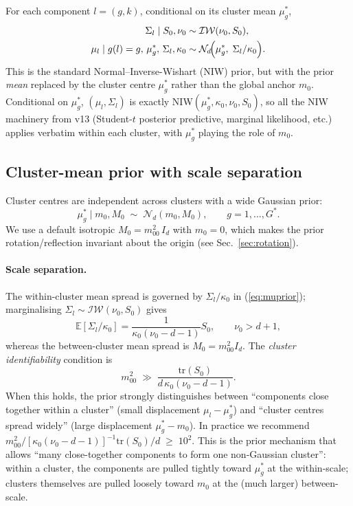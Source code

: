 \documentclass[11pt]{article}
\newcommand{\IW}{\mathcal{IW}}
\newcommand{\tr}{\mathrm{tr}}
\begin{document}
For each component $l=(g,k)$, conditional on its cluster mean $\mu_g^*$,
\begin{align}
\Sigma_l \mid S_0,\nu_0 &\sim \IW(\nu_0,S_0), \label{eq:Sigprior}\\
\mu_l \mid g(l)=g,\,\mu_g^*,\,\Sigma_l,\kappa_0
   &\sim \mathcal{N}_d\!\Bigl(\mu_g^*,\;\Sigma_l/\kappa_0\Bigr).
\label{eq:muprior}
\end{align}
This is the standard Normal--Inverse-Wishart (NIW) prior, but with the
prior \emph{mean} replaced by the cluster centre $\mu_g^*$ rather than the
global anchor $m_0$. Conditional on $\mu_g^*$, $(\mu_l,\Sigma_l)$ is
exactly NIW$(\mu_g^*,\kappa_0,\nu_0,S_0)$, so all the NIW machinery from
v13 (Student-$t$ posterior predictive, marginal likelihood, etc.) applies
verbatim within each cluster, with $\mu_g^*$ playing the role of $m_0$.

\subsection{Cluster-mean prior with scale separation}
\label{sec:cmprior}

Cluster centres are independent across clusters with a wide Gaussian prior:
\begin{equation}
\mu_g^* \mid m_0,M_0 \;\sim\; \mathcal{N}_d(m_0,M_0),
\qquad g=1,\ldots,G^*.
\label{eq:must}
\end{equation}
We use a default isotropic $M_0 = m_{00}^2\,I_d$ with $m_0=0$, which makes
the prior rotation/reflection invariant about the origin
(see Sec.~\ref{sec:rotation}).

\paragraph{Scale separation.} The within-cluster mean spread is governed
by $\Sigma_l/\kappa_0$ in (\ref{eq:muprior}); marginalising
$\Sigma_l\sim\IW(\nu_0,S_0)$ gives
\begin{equation}
\mathbb{E}[\Sigma_l/\kappa_0]
 = \frac{1}{\kappa_0(\nu_0-d-1)} S_0,
\qquad \nu_0>d+1,
\label{eq:withinscale}
\end{equation}
whereas the between-cluster mean spread is $M_0=m_{00}^2 I_d$. The
\emph{cluster identifiability} condition is
\begin{equation}
\boxed{\;\;
m_{00}^2 \;\gg\; \frac{\tr(S_0)}{d\,\kappa_0(\nu_0-d-1)}.
\;\;}
\label{eq:scalesep}
\end{equation}
When this holds, the prior strongly distinguishes between
``components close together within a cluster'' (small displacement
$\mu_l-\mu_g^*$) and ``cluster centres spread widely'' (large
displacement $\mu_g^*-m_0$). In practice we recommend
$m_{00}^2/[\kappa_0(\nu_0-d-1)]^{-1}\tr(S_0)/d \;\ge\; 10^2$.
This is the prior mechanism that allows ``many close-together components
to form one non-Gaussian cluster'': within a cluster, the components
are pulled tightly toward $\mu_g^*$ at the within-scale; clusters
themselves are pulled loosely toward $m_0$ at the (much larger)
between-scale.
\end{document}
